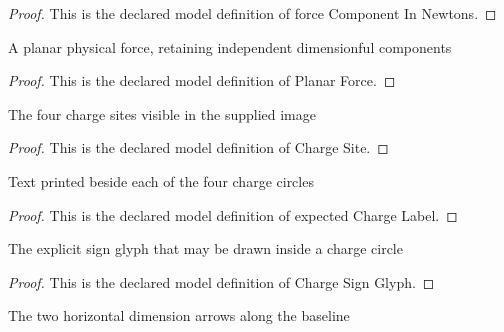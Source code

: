 \begin{proof}
  This is the declared model definition of force Component In Newtons.
\end{proof}
\begin{definition}
  \label{def:physics:phyx-mini-0899:phyxminiproblems-problemphyxmini0899-planarforce}
  A planar physical force, retaining independent dimensionful components
\end{definition}
\begin{proof}
  This is the declared model definition of Planar Force.
\end{proof}
\begin{definition}
  \label{def:physics:phyx-mini-0899:phyxminiproblems-problemphyxmini0899-chargesite}
  The four charge sites visible in the supplied image
\end{definition}
\begin{proof}
  This is the declared model definition of Charge Site.
\end{proof}
\begin{definition}
  \label{def:physics:phyx-mini-0899:phyxminiproblems-problemphyxmini0899-expectedchargelabel}
  Text printed beside each of the four charge circles
\end{definition}
\begin{proof}
  This is the declared model definition of expected Charge Label.
\end{proof}
\begin{definition}
  \label{def:physics:phyx-mini-0899:phyxminiproblems-problemphyxmini0899-chargesignglyph}
  The explicit sign glyph that may be drawn inside a charge circle
\end{definition}
\begin{proof}
  This is the declared model definition of Charge Sign Glyph.
\end{proof}
\begin{definition}
  \label{def:physics:phyx-mini-0899:phyxminiproblems-problemphyxmini0899-horizontalspan}
  The two horizontal dimension arrows along the baseline
\end{definition}

